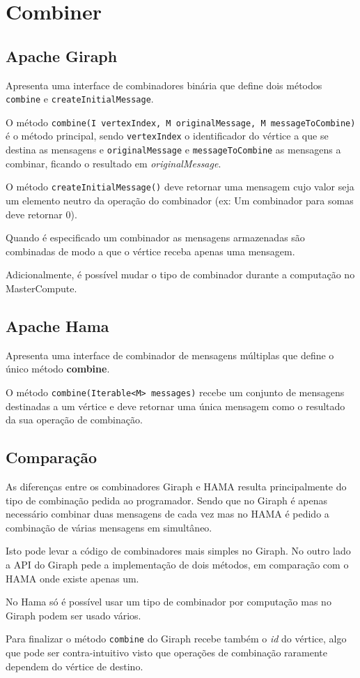 \newpage
\section{Combiner}

\subsection*{Apache Giraph}
Apresenta uma interface de combinadores binária que define dois métodos \texttt{combine} e \texttt{createInitialMessage}.

O método \texttt{combine(I vertexIndex, M originalMessage, M messageToCombine)} é o método principal, sendo \texttt{vertexIndex} o identificador do vértice a que se destina as mensagens e \texttt{originalMessage} e \texttt{messageToCombine} as mensagens a combinar, ficando o resultado em \textsl{originalMessage}.

O método \texttt{createInitialMessage()} deve retornar uma mensagem cujo valor seja um elemento neutro da operação do combinador (ex: Um combinador para somas deve retornar 0).

Quando é especificado um combinador as mensagens armazenadas são combinadas de modo a que o vértice receba apenas uma mensagem.

Adicionalmente, é possível mudar o tipo de combinador durante a computação no MasterCompute.
\subsection*{Apache Hama}
Apresenta uma interface de combinador de mensagens múltiplas que define o único método \textbf{combine}.

O método \texttt{combine(Iterable<M> messages)} recebe um conjunto de mensagens destinadas a um vértice e deve retornar uma única mensagem como o resultado da sua operação de combinação.


\subsection*{Comparação}
As diferenças entre os combinadores Giraph e HAMA resulta principalmente do tipo de combinação pedida ao programador. Sendo que no Giraph é apenas necessário combinar duas mensagens de cada vez mas no HAMA é pedido a combinação de várias mensagens em simultâneo.

Isto pode levar a código de combinadores mais simples no Giraph. No outro lado a API do Giraph pede a implementação de dois métodos, em comparação com o HAMA onde existe apenas um.

No Hama só é possível usar um tipo de combinador por computação mas no Giraph podem ser usado vários.

Para finalizar o método \texttt{combine} do Giraph recebe também o \textit{id} do vértice, algo que pode ser contra-intuitivo visto que operações de combinação raramente dependem do vértice de destino.
